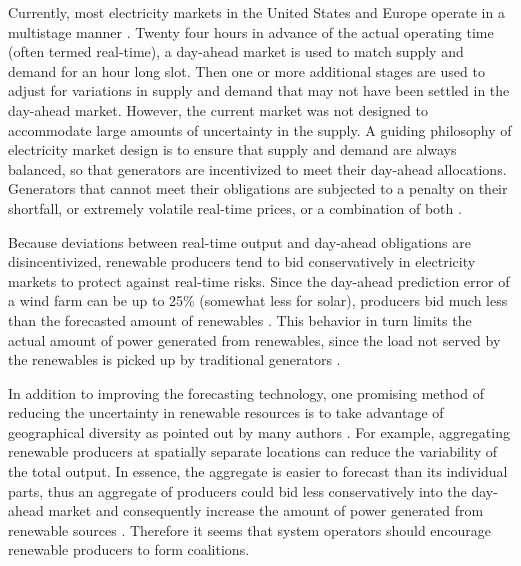 \documentclass[journal]{IEEEtran}
\begin{document}
Currently, most electricity markets in the United States and Europe operate in a multistage manner \cite{Kirschen04,Pinson14}. Twenty four hours in advance of the actual operating time (often termed real-time),  a day-ahead market is used to match supply and demand for an hour long slot. Then one or more additional stages are used to adjust for variations in supply and demand that may not have been settled in the day-ahead market. However, the current market was not designed to accommodate large amounts of uncertainty in the supply.  A guiding philosophy of electricity market design is to ensure that supply and demand are always balanced, so that generators are incentivized to meet their day-ahead allocations. Generators that cannot meet their obligations are subjected to a penalty on their shortfall, or extremely volatile real-time prices, or a combination of both \cite{Pinson14}. 

Because deviations between real-time output and day-ahead obligations are disincentivized, renewable producers tend to bid conservatively in electricity markets to protect against real-time risks. Since the day-ahead prediction error of a wind farm can be up to 25\% (somewhat less for solar), producers bid much less than the forecasted amount of renewables \cite{GE10,NERC09,Holttinen11}. This behavior in turn limits the actual amount of power generated from renewables, since the load not served by the renewables is picked up by traditional generators \cite{Varaiya11}. 

In addition to improving the forecasting technology, one promising method of reducing the uncertainty in renewable resources is to take advantage of geographical diversity as pointed out by many authors \cite{NERC09,EnerNex10,Diakov12,Zhao13,GQ12,Makarov09,Pinson13}. For example, aggregating renewable producers at spatially separate locations can reduce the variability of the total output. In essence, the aggregate is easier to forecast than its individual parts, thus an aggregate of producers could bid less conservatively into the day-ahead market and consequently increase the amount of power generated from renewable sources \cite{Klessmann08,Abbad10,Morales10,Bitar12,Baeyens13}. Therefore it seems that system operators should encourage renewable producers to form coalitions.  
\end{document}
